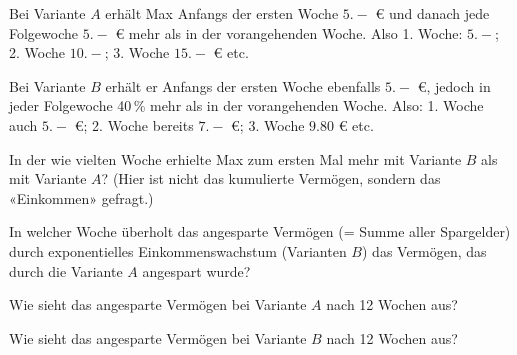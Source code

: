 Bei Variante $A$ erhält Max Anfangs der ersten Woche  $5.-$ \euro{} und danach jede Folgewoche $5.-$ \euro{} mehr als in der vorangehenden Woche. Also 1. Woche: $5.-$; 2. Woche $10.-$; 3. Woche $15.-$ \euro{} etc.

Bei Variante $B$ erhält er Anfangs der ersten Woche ebenfalls $5.-$
\euro{}, jedoch in jeder Folgewoche 40\,\% mehr als in der vorangehenden
Woche. Also: 1. Woche auch $5.-$ \euro{}; 2. Woche bereits $7.-$ \euro{}; 3. Woche $9.80$ \euro{} etc.

\begin{bbwAufgabenBlock}
\item In der wie vielten  Woche erhielte Max zum ersten Mal mehr mit Variante $B$ als mit Variante $A$? (Hier ist nicht das kumulierte Vermögen, sondern das «Einkommen» gefragt.)

\item In welcher Woche überholt das angesparte Vermögen (= Summe aller
  Spargelder) durch exponentielles Einkommenswachstum (Varianten $B$) das Vermögen, das durch die Variante $A$ angespart wurde?

\item Wie sieht das angesparte Vermögen bei Variante $A$ nach 12 Wochen aus?

\item Wie sieht das angesparte Vermögen bei Variante $B$ nach 12 Wochen aus?
\end{bbwAufgabenBlock}
\platzFuerBerechnungenBisEndeSeite{}



\newpage
